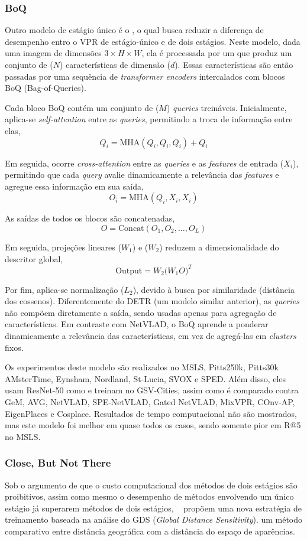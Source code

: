 \documentclass[letterpaper, 10 pt, conference]{ieeeconf}  %
\begin{document}
\subsubsection{BoQ}

Outro modelo de estágio único é o \cite{boq}, o qual busca reduzir a diferença de desempenho entro o VPR de estágio-único e de dois estágios. Neste modelo, dada uma imagem de dimensões $3\times H\times W$, ela é processada por um  que produz um conjunto de ($N$) características de dimensão ($d$). Essas características são então passadas por uma sequência de \textit{transformer encoders} intercalados com blocos BoQ (Bag-of-Queries).

Cada bloco BoQ contém um conjunto de ($M$) \textit{queries} treináveis. Inicialmente, aplica-se \textit{self-attention} entre as \textit{queries}, permitindo a troca de informação entre elas,
$$
Q_i = \text{MHA}(Q_i, Q_i, Q_i) + Q_i$$

Em seguida, ocorre \textit{cross-attention} entre as \textit{queries} e as \textit{features} de entrada ($X_i$), permitindo que cada \textit{query} avalie dinamicamente a relevância das \textit{features} e agregue essa informação em sua saída,
$$
O_i = \text{MHA}(Q_i, X_i, X_i)
$$

As saídas de todos os blocos são concatenadas,
 $$
 O = \text{Concat}(O_1, O_2, \dots, O_L)
 $$

 Em seguida, projeções lineares ($W_1$) e ($W_2$) reduzem a dimensionalidade do descritor global,
 $$
 \text{Output} = W_2\big(W_1 O\big)^T
 $$

Por fim, aplica-se normalização ($L_2$), devido à busca por similaridade (distância dos cossenos). Diferentemente do DETR (um modelo similar anterior), as \textit{queries} não compõem diretamente a saída, sendo usadas apenas para agregação de características. Em contraste com NetVLAD, o BoQ aprende a ponderar dinamicamente a relevância das características, em vez de agregá-las em \textit{clusters} fixos.

Os experimentos deste modelo são realizados no MSLS, Pitts250k, Pitts30k AMsterTime, Eynsham, Nordland, St-Lucia, SVOX e SPED. Além disso, eles usam ResNet-50 como  e treinam no GSV-Cities, assim como é comparado contra GeM, AVG, NetVLAD, SPE-NetVLAD, Gated NetVLAD, MixVPR, COnv-AP, EigenPlaces e Cosplace. Resultados de tempo computacional não são mostrados, mas este modelo foi melhor em quase todos os casos, sendo somente pior em R@5 no MSLS.


\subsubsection{Close, But Not There}
Sob o argumento de que o custo computacional dos métodos de dois estágios são proibitivos, assim como mesmo o desempenho de métodos envolvendo um único estágio já superarem métodos de dois estágios, \citeauthor{close}~\cite{close} propõem uma nova estratégia de treinamento baseada na análise do GDS (\textit{Global Distance Sensitivity}). um método comparativo entre distância geográfica com a  distância do espaço de aparências.
\end{document}
